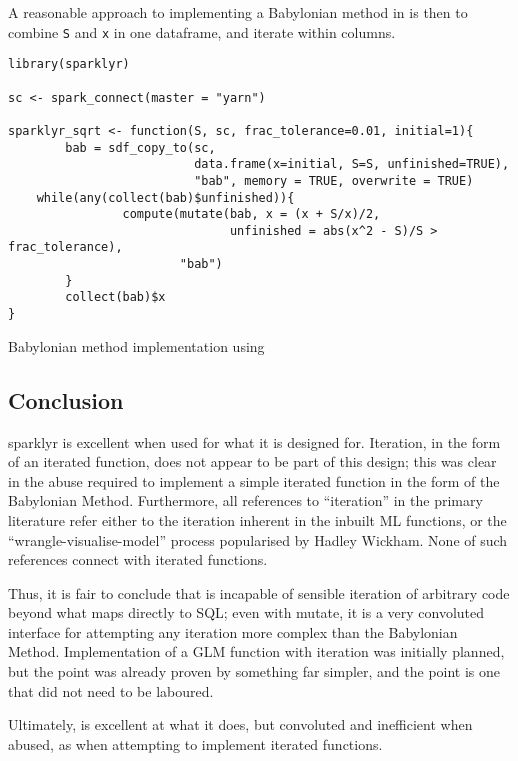 A reasonable approach to implementing a Babylonian method in  is
then to combine \texttt{S} and \texttt{x} in one dataframe, and iterate
within columns.

\begin{listing}
	\begin{verbatim}
library(sparklyr)

sc <- spark_connect(master = "yarn")

sparklyr_sqrt <- function(S, sc, frac_tolerance=0.01, initial=1){
        bab = sdf_copy_to(sc,
                          data.frame(x=initial, S=S, unfinished=TRUE),
                          "bab", memory = TRUE, overwrite = TRUE)
	while(any(collect(bab)$unfinished)){
                compute(mutate(bab, x = (x + S/x)/2,
                               unfinished = abs(x^2 - S)/S > frac_tolerance),
                        "bab")
        }
        collect(bab)$x
}
\end{verbatim}
	\caption{Babylonian method implementation using }
	\label{lst:sparklyr-bab}
\end{listing}

\hypertarget{sec:conclusion}{%
	\subsection{Conclusion}\label{sec:conclusion}}

sparklyr is excellent when used for what it is designed for. Iteration,
in the form of an iterated function, does not appear to be part of this
design; this was clear in the abuse required to implement a simple
iterated function in the form of the Babylonian Method. Furthermore, all
references to ``iteration'' in the primary  literature refer
either to the iteration inherent in the inbuilt  ML functions, or
the ``wrangle-visualise-model'' process popularised by Hadley
Wickham\cite{luraschi2019mastering}\cite{wickham2016r}. None of such
references connect with iterated functions.

Thus, it is fair to conclude that  is incapable of sensible
iteration of arbitrary \R code beyond what maps directly to SQL; even
with mutate, it is a very convoluted interface for attempting any
iteration more complex than the Babylonian Method. Implementation of a
GLM function with  iteration was initially planned, but the
point was already proven by something far simpler, and the point is one
that did not need to be laboured.

Ultimately,  is excellent at what it does, but convoluted and
inefficient when abused, as when attempting to implement iterated
functions.